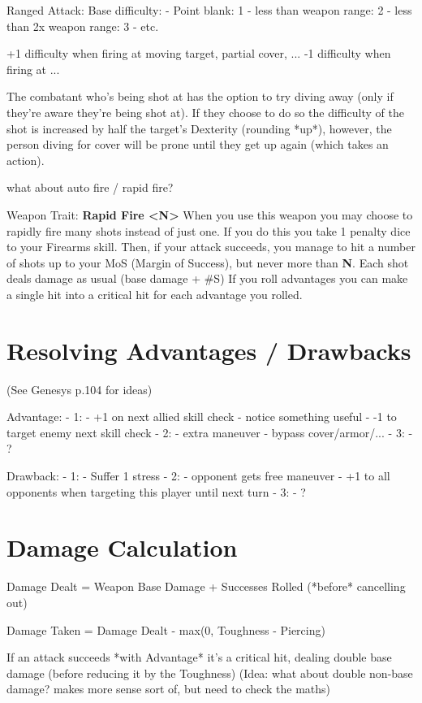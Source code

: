 Ranged Attack:  
Base difficulty: 
  - Point blank: 1
  - less than weapon range: 2
  - less than 2x weapon range: 3
  - etc.

+1 difficulty when firing at moving target, partial cover, ...
-1 difficulty when firing at ...

The combatant who's being shot at has the option to try diving away (only if they're aware they're being shot at). If they choose to do so the difficulty of the shot is increased by half the target's Dexterity (rounding *up*), however, the person diving for cover will be prone until they get up again (which takes an action).

what about auto fire / rapid fire?  

Weapon Trait: \textbf{Rapid Fire  <N>}
When you use this weapon you may choose to rapidly fire many shots instead of just one. If you do this you take 1 penalty dice to your Firearms skill. Then, if your attack succeeds, you manage to hit a number of shots up to your MoS (Margin of Success), but never more than \textbf{N}. Each shot deals damage as usual (base damage + \#S)
If you roll advantages you can make a single hit into a critical hit for each advantage you rolled.



\section{Resolving Advantages / Drawbacks}

(See Genesys p.104 for ideas)

Advantage:
  - 1:
    - +1 on next allied skill check
    - notice something useful
    - -1 to target enemy next skill check
  - 2:
    - extra maneuver
    - bypass cover/armor/...
  - 3:
    - ?

Drawback:
  - 1:
    - Suffer 1 stress
  - 2:
    - opponent gets free maneuver
    - +1 to all opponents when targeting this player until next turn
  - 3:
    - ?
  


\section{Damage Calculation}

Damage Dealt = Weapon Base Damage + Successes Rolled (*before* cancelling out)

Damage Taken = Damage Dealt - max(0, Toughness - Piercing) 

If an attack succeeds *with Advantage* it's a critical hit, dealing double base damage (before reducing it by the Toughness)
(Idea: what about double non-base damage? makes more sense sort of, but need to check the maths)

